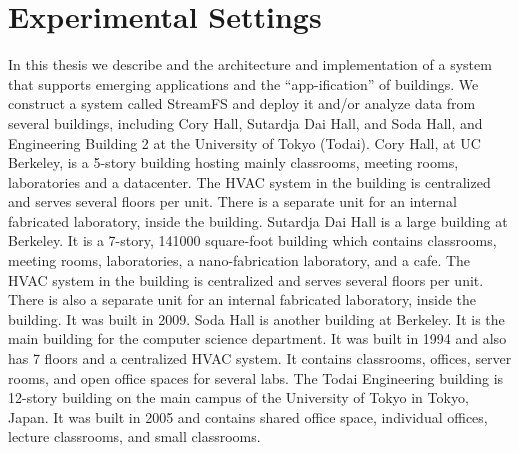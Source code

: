 \section{Experimental Settings}
In this thesis we describe and the architecture and implementation of a system that supports emerging applications and the ``app-ification''
of buildings.  We construct a system called StreamFS and deploy it and/or analyze data from several buildings, including
Cory Hall, Sutardja Dai Hall, and Soda Hall, and Engineering Building 2 at the University of Tokyo (Todai).
Cory Hall, at UC Berkeley, is a 5-story building hosting mainly classrooms, meeting rooms, laboratories and a datacenter.
The HVAC system in the building is centralized and serves several floors per unit.
There is a separate unit for an internal fabricated laboratory, inside the building.
Sutardja Dai Hall is a large building at Berkeley.  It is a 7-story, 141000 square-foot 
 building which contains classrooms, meeting rooms, laboratories, a nano-fabrication laboratory, and a cafe.
The HVAC system in the building is centralized and serves several floors per unit.
There is also a separate unit for an internal fabricated laboratory, inside the building.  It was built in 2009.
Soda Hall is another building at Berkeley.  It is the main building for the computer science department.
It was built in 1994 and also has 7 floors and a centralized HVAC system.  It contains classrooms, 
offices, server rooms, and open office spaces for several labs.
The Todai Engineering building is 12-story building on the main campus of the University of Tokyo in Tokyo, Japan.
It was built in 2005 and contains shared office space, individual offices, lecture classrooms, and small
classrooms.

